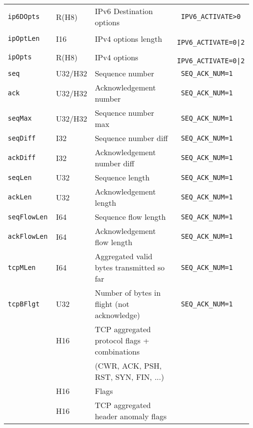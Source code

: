 \documentclass[documentation]{subfiles}
\begin{document}
\begin{longtable}{>{\tt}lll>{\tt\small}l}
    ip6DOpts                         & R(H8)   & IPv6 Destination options                     & IPV6\_ACTIVATE>0\\
    ipOptLen                         & I16     & IPv4 options length                          & IPV6\_ACTIVATE=0|2\\
    ipOpts                           & R(H8)   & IPv4 options                                 & IPV6\_ACTIVATE=0|2\\
    seq                              & U32/H32 & Sequence number                              & SEQ\_ACK\_NUM=1\\
    ack                              & U32/H32 & Acknowledgement number                       & SEQ\_ACK\_NUM=1\\
    seqMax                           & U32/H32 & Sequence number max                          & SEQ\_ACK\_NUM=1\\
    seqDiff                          & I32     & Sequence number diff                         & SEQ\_ACK\_NUM=1\\
    ackDiff                          & I32     & Acknowledgement number diff                  & SEQ\_ACK\_NUM=1\\
    seqLen                           & U32     & Sequence length                              & SEQ\_ACK\_NUM=1\\
    ackLen                           & U32     & Acknowledgement length                       & SEQ\_ACK\_NUM=1\\
    seqFlowLen                       & I64     & Sequence flow length                         & SEQ\_ACK\_NUM=1\\
    ackFlowLen                       & I64     & Acknowledgement flow length                  & SEQ\_ACK\_NUM=1\\
    tcpMLen                          & I64     & Aggregated valid bytes transmitted so far    & SEQ\_ACK\_NUM=1\\
    tcpBFlgt                         & U32     & Number of bytes in flight (not acknowledge)  & SEQ\_ACK\_NUM=1\\
    \nameref{tcpFStat}               & H16     & TCP aggregated protocol flags + combinations & \\
                                     &         & (CWR, ACK, PSH, RST, SYN, FIN, ...)          & \\
    \nameref{tcpFlags}               & H16     & Flags                                        & \\
    \nameref{tcpAnomaly}             & H16     & TCP aggregated header anomaly flags          & \\

\end{longtable}
\end{document}
